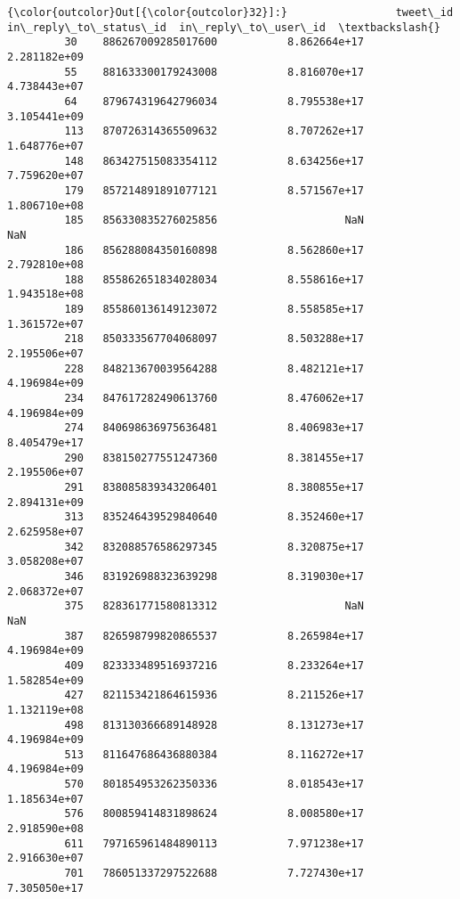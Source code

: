 \documentclass[11pt]{article}
\begin{document}
\begin{Verbatim}[commandchars=\\\{\}]
{\color{outcolor}Out[{\color{outcolor}32}]:}                 tweet\_id  in\_reply\_to\_status\_id  in\_reply\_to\_user\_id  \textbackslash{}
         30    886267009285017600           8.862664e+17         2.281182e+09   
         55    881633300179243008           8.816070e+17         4.738443e+07   
         64    879674319642796034           8.795538e+17         3.105441e+09   
         113   870726314365509632           8.707262e+17         1.648776e+07   
         148   863427515083354112           8.634256e+17         7.759620e+07   
         179   857214891891077121           8.571567e+17         1.806710e+08   
         185   856330835276025856                    NaN                  NaN   
         186   856288084350160898           8.562860e+17         2.792810e+08   
         188   855862651834028034           8.558616e+17         1.943518e+08   
         189   855860136149123072           8.558585e+17         1.361572e+07   
         218   850333567704068097           8.503288e+17         2.195506e+07   
         228   848213670039564288           8.482121e+17         4.196984e+09   
         234   847617282490613760           8.476062e+17         4.196984e+09   
         274   840698636975636481           8.406983e+17         8.405479e+17   
         290   838150277551247360           8.381455e+17         2.195506e+07   
         291   838085839343206401           8.380855e+17         2.894131e+09   
         313   835246439529840640           8.352460e+17         2.625958e+07   
         342   832088576586297345           8.320875e+17         3.058208e+07   
         346   831926988323639298           8.319030e+17         2.068372e+07   
         375   828361771580813312                    NaN                  NaN   
         387   826598799820865537           8.265984e+17         4.196984e+09   
         409   823333489516937216           8.233264e+17         1.582854e+09   
         427   821153421864615936           8.211526e+17         1.132119e+08   
         498   813130366689148928           8.131273e+17         4.196984e+09   
         513   811647686436880384           8.116272e+17         4.196984e+09   
         570   801854953262350336           8.018543e+17         1.185634e+07   
         576   800859414831898624           8.008580e+17         2.918590e+08   
         611   797165961484890113           7.971238e+17         2.916630e+07   
         701   786051337297522688           7.727430e+17         7.305050e+17   

\end{Verbatim}
\end{document}

